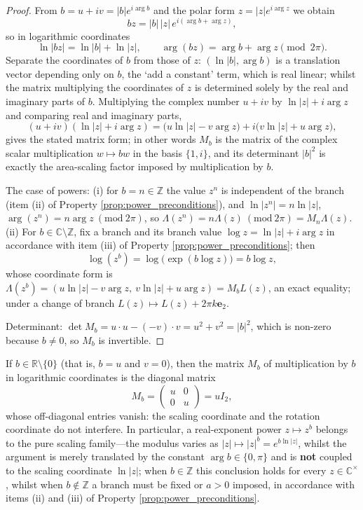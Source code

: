 \begin{proof}
From $b=u+iv=|b|e^{i\arg b}$ and the polar form $z=|z|e^{i\arg z}$ we obtain
\[
bz=|b|\,|z|\,e^{i(\arg b+\arg z)},
\]
so in logarithmic coordinates
\[
\ln|bz|=\ln|b|+\ln|z|,\qquad \arg(bz)=\arg b+\arg z\pmod{2\pi}.
\]
Separate the coordinates of $b$ from those of $z$: $(\ln|b|,\arg b)$ is a translation vector depending only on $b$, the `add a constant' term, which is real linear; whilst the matrix multiplying the coordinates of $z$ is determined solely by the real and imaginary parts of $b$. Multiplying the complex number $u+iv$ by $\ln|z|+i\arg z$ and comparing real and imaginary parts,
\[
(u+iv)(\ln|z|+i\arg z)=\bigl(u\ln|z|-v\arg z\bigr)+i\bigl(v\ln|z|+u\arg z\bigr),
\]
gives the stated matrix form; in other words $M_b$ is the matrix of the complex scalar multiplication $w\mapsto bw$ in the basis $\{1,i\}$, and its determinant $|b|^2$ is exactly the area-scaling factor imposed by multiplication by $b$.

The case of powers: (i) for $b=n\in\mathbb{Z}$ the value $z^n$ is independent of the branch (item (ii) of Property \ref{prop:power_preconditions}), and $\ln|z^n|=n\ln|z|$, $\arg(z^n)=n\arg z\ (\mathrm{mod}\ 2\pi)$, so $\Lambda(z^n)=n\Lambda(z)\ (\mathrm{mod}\ 2\pi)=M_n\Lambda(z)$. (ii) For $b\in\mathbb{C}\setminus\mathbb{Z}$, fix a branch and its branch value $\log z=\ln|z|+i\arg z$ in accordance with item (iii) of Property \ref{prop:power_preconditions}; then
\[
\log(z^b)=\log\bigl(\exp(b\log z)\bigr)=b\log z,
\]
whose coordinate form is $\Lambda(z^b)=(u\ln|z|-v\arg z,\ v\ln|z|+u\arg z)=M_bL(z)$, an exact equality; under a change of branch $L(z)\mapsto L(z)+2\pi k\mathbf{e}_2$.

Determinant: $\det M_b=u\cdot u-(-v)\cdot v=u^2+v^2=|b|^2$, which is non-zero because $b\neq0$, so $M_b$ is invertible.
\end{proof}

\begin{lemma}\label{lem:real_power_no_coupling}
If $b\in\mathbb{R}\setminus\{0\}$ (that is, $b=u$ and $v=0$), then the matrix $M_b$ of multiplication by $b$ in logarithmic coordinates is the diagonal matrix
\[
M_b=\begin{pmatrix}u&0\\ 0&u\end{pmatrix}=uI_2,
\]
whose off-diagonal entries vanish: the scaling coordinate and the rotation coordinate do not interfere. In particular, a real-exponent power $z\mapsto z^b$ belongs to the pure scaling family---the modulus varies as $|z|\mapsto|z|^b=e^{b\ln|z|}$, whilst the argument is merely translated by the constant $\arg b\in\{0,\pi\}$ and is \textbf{not} coupled to the scaling coordinate $\ln|z|$; when $b\in\mathbb{Z}$ this conclusion holds for every $z\in\mathbb{C}^{\times}$, whilst when $b\notin\mathbb{Z}$ a branch must be fixed or $a>0$ imposed, in accordance with items (ii) and (iii) of Property \ref{prop:power_preconditions}.
\end{lemma}

